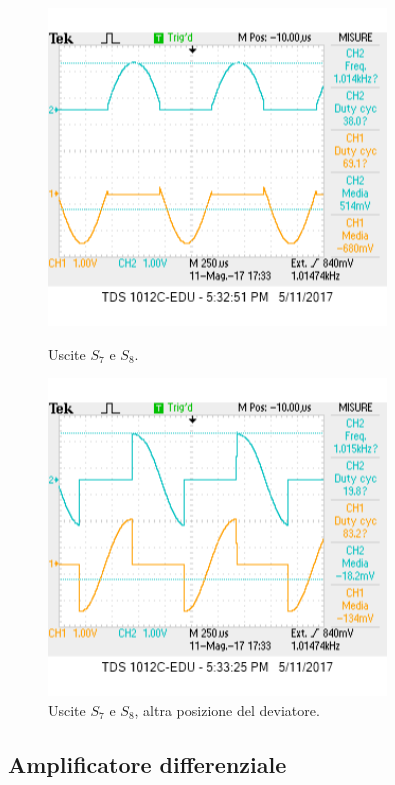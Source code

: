 \documentclass[a4paper,10pt]{article}
\begin{document}
\begin{figure}[H]
\begin{minipage}{0.49\textwidth}
	\centering
	\includegraphics[width=0.8\textwidth]{../grafici/s7s8fasegiusta.png}
	\caption{Uscite $ S_7 $ e $ S_8 $.}
	\label{fig:s7s8}
\end{minipage}
\begin{minipage}{0.49\textwidth}
	\centering
	\includegraphics[width=0.8\textwidth]{../grafici/s7s8fasegiusta90gradi.png}
	\caption{Uscite $ S_7 $ e $ S_8 $, altra posizione del deviatore.}
	\label{fig:s7s8a90}
\end{minipage}
\end{figure}

\subsection{Amplificatore differenziale}
\end{document}
